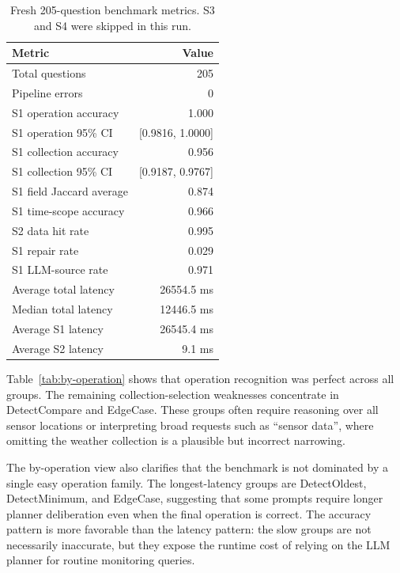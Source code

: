 \documentclass[11pt]{article}
\begin{document}
\begin{table}[!htbp]
\centering
\small
\caption{Fresh 205-question benchmark metrics. S3 and S4 were skipped in this run.}
\label{tab:main-results}
\begin{tabular}{lr}
\toprule
Metric & Value \\
\midrule
Total questions & 205 \\
Pipeline errors & 0 \\
S1 operation accuracy & 1.000 \\
S1 operation 95\% CI & [0.9816, 1.0000] \\
S1 collection accuracy & 0.956 \\
S1 collection 95\% CI & [0.9187, 0.9767] \\
S1 field Jaccard average & 0.874 \\
S1 time-scope accuracy & 0.966 \\
S2 data hit rate & 0.995 \\
S1 repair rate & 0.029 \\
S1 LLM-source rate & 0.971 \\
Average total latency & 26554.5 ms \\
Median total latency & 12446.5 ms \\
Average S1 latency & 26545.4 ms \\
Average S2 latency & 9.1 ms \\
\bottomrule
\end{tabular}
\end{table}

Table~\ref{tab:by-operation} shows that operation recognition was perfect across all groups. The remaining collection-selection weaknesses concentrate in DetectCompare and EdgeCase. These groups often require reasoning over all sensor locations or interpreting broad requests such as ``sensor data'', where omitting the weather collection is a plausible but incorrect narrowing.

The by-operation view also clarifies that the benchmark is not dominated by a single easy operation family. The longest-latency groups are DetectOldest, DetectMinimum, and EdgeCase, suggesting that some prompts require longer planner deliberation even when the final operation is correct. The accuracy pattern is more favorable than the latency pattern: the slow groups are not necessarily inaccurate, but they expose the runtime cost of relying on the LLM planner for routine monitoring queries.
\end{document}
